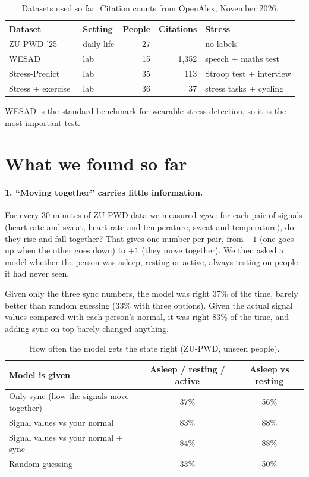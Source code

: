 \documentclass{article}
\begin{document}
\begin{table}[h]
\centering
\caption{Datasets used so far. Citation counts from OpenAlex, November 2026.}
\begin{tabular}{llrrl}
\toprule
Dataset & Setting & People & Citations & Stress \\
\midrule
ZU-PWD '25~\cite{zupwd} & daily life & 27 & -- & no labels \\
WESAD~\cite{wesad} & lab & 15 & 1{,}352 & speech + maths test \\
Stress-Predict~\cite{stresspredict} & lab & 35 & 113 & Stroop test + interview \\
Stress + exercise~\cite{stressexercise} & lab & 36 & 37 & stress tasks + cycling \\
\bottomrule
\end{tabular}
\end{table}

WESAD is the standard benchmark for wearable stress detection, so it is the most important test.

\section{What we found so far}

\paragraph{1. ``Moving together'' carries little information.} For every 30 minutes of ZU-PWD data we measured \emph{sync}: for each pair of signals (heart rate and sweat, heart rate and temperature, sweat and temperature), do they rise and fall together? That gives one number per pair, from $-1$ (one goes up when the other goes down) to $+1$ (they move together). We then asked a model whether the person was asleep, resting or active, always testing on people it had never seen.

Given only the three sync numbers, the model was right 37\% of the time, barely better than random guessing (33\% with three options). Given the actual signal values compared with each person's normal, it was right 83\% of the time, and adding sync on top barely changed anything.

\begin{table}[h]
\centering
\caption{How often the model gets the state right (ZU-PWD, unseen people).}
\begin{tabular}{lcc}
\toprule
Model is given & Asleep / resting / active & Asleep vs resting \\
\midrule
Only sync (how the signals move together) & 37\% & 56\% \\
Signal values vs your normal & 83\% & 88\% \\
Signal values vs your normal + sync & 84\% & 88\% \\
\midrule
Random guessing & 33\% & 50\% \\
\bottomrule
\end{tabular}
\end{table}
\end{document}
